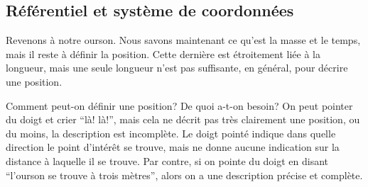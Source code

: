 

\subsection{Référentiel et système de coordonnées}

Revenons à notre ourson.  Nous savons maintenant ce qu'est la masse et le
temps, mais il reste à définir la position.  Cette dernière est étroitement
liée à la longueur, mais une seule longueur n'est pas suffisante, en général,
pour décrire une position.

Comment peut-on définir une position?  De quoi a-t-on
besoin? On peut pointer du doigt et crier ``là! là!'', mais cela ne décrit pas
très clairement une position, ou du moins, la description est incomplète.  Le
doigt pointé indique dans quelle direction le point d'intérêt se trouve, mais
ne donne aucune indication sur la distance à laquelle il se trouve.  Par
contre, si on pointe du doigt en disant ``l'ourson se trouve à trois mètres'',
alors on a une description précise et complète.

